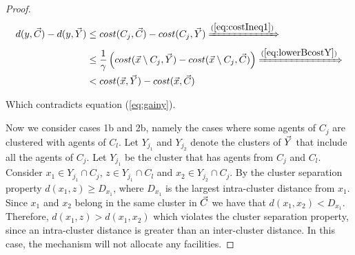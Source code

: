 \begin{proof}
\begin{align*}
   d(y,\vec{C})-d(y,\vec{Y})  &\le cost(C_j,\vec{C})-cost(C_j,\vec{Y}) \xRightarrow{(\ref{eq:costIneq1})}\\
   &\le \frac{1}{\gamma} \left( cost(\vec{x}\setminus C_j,\vec{Y}) - cost(\vec{x}\setminus C_j,\vec{C}) \right) \xRightarrow{(\ref{eq:lowerBcostY})}\\
   &< cost(\vec{x},\vec{Y}) - cost(\vec{x},\vec{C})
\end{align*}

Which contradicts equation (\ref{eq:gainy}).



\bigskip

Now we consider cases 1b and 2b, namely the cases where some agents of $C_j$ are clustered with agents of $C_l$. Let $Y_{j_1}$ and $Y_{j_2}$ denote the clusters of $\vec{Y}$ that include all the agents of $C_j$. Let $Y_{j_1}$ be the cluster that has agents from $C_j$ and $C_l$. Consider $x_1 \in Y_{j_1} \cap C_j$, $z\in Y_{j_1} \cap C_l$ and $x_2 \in Y_{j_2}\cap C_j$. By the cluster separation property $d(x_1,z) \ge D_{x_1}$, where $D_{x_1}$ is the largest intra-cluster distance from $x_1$. Since $x_1$ and $x_2$ belong in the same cluster in $\vec{C}$ we have that $d(x_1,x_2)<D_{x_1}$. Therefore, $d(x_1,z)>d(x_1,x_2)$ which violates the cluster separation property, since an intra-cluster distance is greater than an inter-cluster distance. In this case, the mechanism will not allocate any facilities. 
\end{proof}